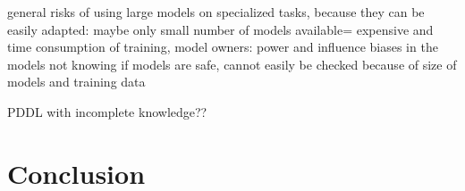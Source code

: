 \documentclass{article}
\begin{document}
\cite{manning_human_2022}
general risks of using large models on specialized tasks, because they can be easily adapted:
maybe only small number of models available= expensive and time consumption of training, model owners: power and influence
biases in the models
not knowing if models are safe, cannot easily be checked because of size of models and training data


PDDL with incomplete knowledge??



\section{Conclusion}















\end{document}
